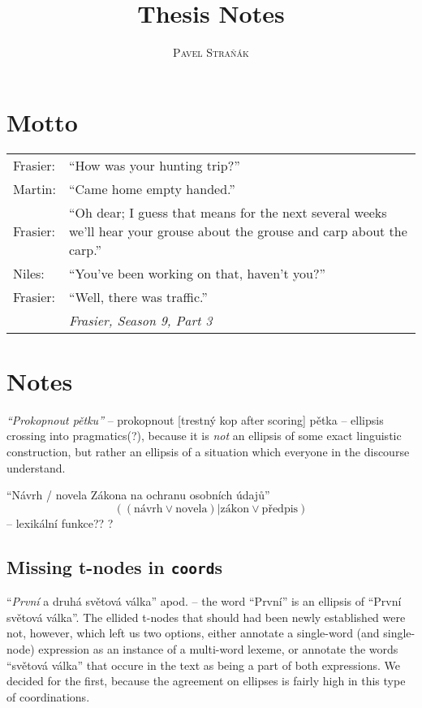 \documentclass[11pt, a4paper]{book}
\title{Thesis Notes}
\author{\textsc{Pavel Straňák}}
\def\code{\texttt}
\begin{document}
\maketitle

\section*{Motto}
\begin{tabular}{@{} lp{11cm} @{}} %
Frasier: & ``How was your hunting trip?''\\
Martin: & ``Came home empty handed.''\\
Frasier: & ``Oh dear; I guess that means for the next several weeks we'll hear your grouse about the grouse and carp about the carp.''\\
Niles: & ``You've been working on that, haven't you?''\\
Frasier: & ``Well, there was traffic.''\\
 & \raggedleft\emph{Frasier, Season 9, Part 3}\\
\end{tabular}



\newpage
\section{Notes}

{\em``Prokopnout pětku''} -- prokopnout [trestný kop after scoring] pětka -- ellipsis crossing into pragmatics(?), because it is {\em not} an ellipsis of some exact linguistic construction, but rather an ellipsis of a situation which everyone in the discourse understand.  

``Návrh / novela Zákona na ochranu osobních údajů''  $$((\mathrm{návrh} \lor \mathrm{novela}) | \mathrm{zákon} \lor \mathrm{předpis})$$
-- lexikální funkce?? \citep{wanner} ?

\subsection{Missing t-nodes in \code{coord}s}
``\textit{První} a druhá světová válka'' apod. -- the word ``První'' is an ellipsis of ``První světová válka''. The ellided t-nodes that should had been newly established were not, however, which left us two options, either annotate a single-word (and single-node) expression as an instance of a multi-word lexeme, or annotate the words ``světová válka'' that occure in the text as being a part of both expressions. We decided for the first, because the agreement on ellipses is fairly high in this type of coordinations.







\end{document}
